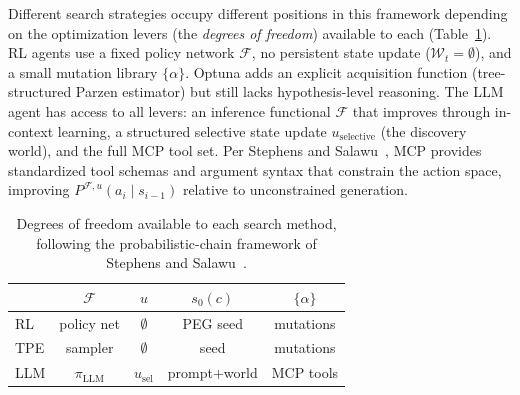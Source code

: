 \documentclass[twocolumn]{fairmeta}
\begin{document}
Different search strategies occupy different positions in this framework depending on the optimization levers (the \emph{degrees of freedom}) available to each (Table~\ref{tab:dof}).
RL agents use a fixed policy network $\mathcal{F}$, no persistent state update ($\mathcal{W}_t = \emptyset$), and a small mutation library $\{\alpha\}$.
Optuna adds an explicit acquisition function (tree-structured Parzen estimator) but still lacks hypothesis-level reasoning.
The LLM agent has access to all levers: an inference functional $\mathcal{F}$ that improves through in-context learning, a structured selective state update $u_\text{selective}$ (the discovery world), and the full MCP tool set.
Per Stephens and Salawu~\cite{stephens2025mathframing}, MCP provides standardized tool schemas and argument syntax that constrain the action space, improving $P^{\mathcal{F},u}(a_i \mid s_{i-1})$ relative to unconstrained generation.

\begin{table}[t]
\centering
\caption{Degrees of freedom available to each search method, following the probabilistic-chain framework of Stephens and Salawu~\cite{stephens2025mathframing}.}
\label{tab:dof}
\small
\begin{tabular}{lcccc}
\toprule
 & $\mathcal{F}$ & $u$ & $s_0(c)$ & $\{\alpha\}$ \\
\midrule
RL    & policy net & $\emptyset$ & PEG seed  & mutations \\
TPE   & sampler   & $\emptyset$ & seed      & mutations \\
LLM   & $\pi_\text{LLM}$ & $u_\text{sel}$ & prompt+world & MCP tools \\
\bottomrule
\end{tabular}
\end{table}
\end{document}
